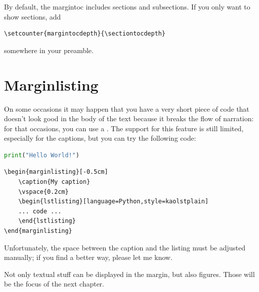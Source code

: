 By default, the margintoc includes sections and subsections.
If you only want to show sections, add
\begin{lstlisting}[style=kaolstplain]
\setcounter{margintocdepth}{\sectiontocdepth}
\end{lstlisting}
somewhere in your preamble.

\section{Marginlisting}

On some occasions it may happen that you have a very short piece of code 
that doesn't look good in the body of the text because it breaks the 
flow of narration: for that occasions, you can use a 
. The support for this feature is still 
limited, especially for the captions, but you can try the following 
code:

\begin{marginlisting}[-1.35cm]
	\caption{An example of a margin listing.}
	\vspace{0.6cm}
	\begin{lstlisting}[language=Python,style=kaolstplain]
print("Hello World!")
	\end{lstlisting}
\end{marginlisting}

\begin{verbatim}
\begin{marginlisting}[-0.5cm]
	\caption{My caption}
	\vspace{0.2cm}
	\begin{lstlisting}[language=Python,style=kaolstplain]
	... code ...
	\end{lstlisting}
\end{marginlisting}
\end{verbatim}

Unfortunately, the space between the caption and the listing must be 
adjusted manually; if you find a better way, please let me know.

Not only textual stuff can be displayed in the margin, but also figures. 
Those will be the focus of the next chapter.

